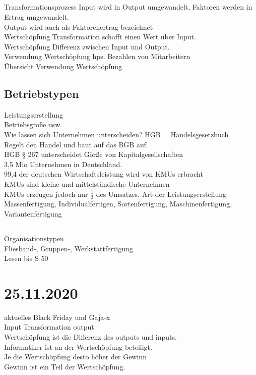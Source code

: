 \documentclass{article}
\begin{document}
	\subsection*{}
	
	Transformationsprozess Input wird in Output umgewandelt, Faktoren werden in Ertrag umgewandelt. \\
	Output wird auch als  Faktorenertrag bezeichnet \\
	Wertschöpfung  Transformation schafft einen Wert über Input. \\
	Wertschöpfung Differenz zwischen Input und Output. \\
	Verwendung Wertschöpfung hps. Bezahlen von Mitarbeitern \\
	Übersicht Verwendung Wertschöpfung \\
	
	\subsection*{Betriebstypen}
	Leistungserstellung \\
	Betriebsgröße usw. \\
	Wie lassen sich Unternehmen unterscheiden?
	HGB = Handelsgesetzbuch \\
	Regelt den Handel und baut auf das BGB auf \\
	HGB § 267 unterscheidet Görße von Kapitalgesellschaften \\
	3,5 Mio Unternehmen in Deutschland. \\
	99,4 der deutschen Wirtschaftsleistung wird von KMUs erbracht \\
	KMUs sind kleine und mittelständische Unternehmen \\
	KMUs erzeugen jedoch nur $\frac{1}{3}$ des Umsatzes.
	Art der Leistungserstellung \\
	Massenfertigung, Individualfertigen, Sortenfertigung, Maschinenfertigung, Variantenfertigung  \\
	\subsection*{}
	Organisationstypen \\
	Fliesband-, Gruppen-, Werkstattfertigung \\
	Lesen bis S 50
	\section*{25.11.2020}
	aktuelles Black Friday und Gaja-x \\
	Input Transformation output \\
	Wertschöpfung ist die Differenz des outputs und inputs. \\
	Informatiker ist an der Wertschöpfung beteiligt. \\
	Je die Wertschöpfung desto höher der Gewinn \\
	Gewinn ist ein Teil der Wertschöpfung. \\
	
\end{document}
